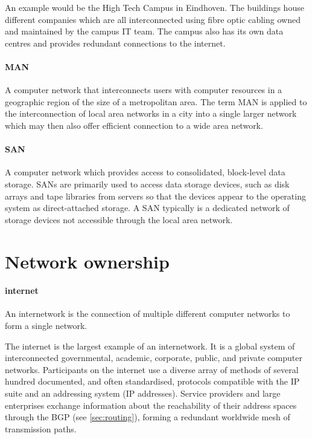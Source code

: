{An example would be the High Tech Campus in Eindhoven.
The buildings house different companies which are all interconnected using fibre optic cabling owned and maintained by the campus \acs{IT} team.
The campus also has its own data centres and provides redundant connections to the internet.

\paragraph{\gls{MAN}}
A computer network that interconnects users with computer resources in a geographic region of the size of a metropolitan area.
The term \gls{MAN} is applied to the interconnection of local area networks in a city into a single larger network which may then also offer efficient connection to a wide area network.

\paragraph{\gls{SAN}}
A computer network which provides access to consolidated, block-level data storage.
\glspl{SAN} are primarily used to access data storage devices, such as disk arrays and tape libraries from servers so that the devices appear to the operating system as direct-attached storage.
A \gls{SAN} typically is a dedicated network of storage devices not accessible through the local area network.


\section{Network ownership}
\label{sec:network-ownership}

\paragraph{internet}
An internetwork is the connection of multiple different computer networks to form a single network.

The internet is the largest example of an internetwork.
It is a global system of interconnected governmental, academic, corporate, public, and private computer networks.
Participants on the internet use a diverse array of methods of several hundred documented, and often standardised, protocols compatible with the \acl{IP} suite and an addressing system (\acs{IP} addresses).
Service providers and large enterprises exchange information about the reachability of their address spaces through the \gls{BGP} (see \vref{sec:routing}), forming a redundant worldwide mesh of transmission paths.

}
